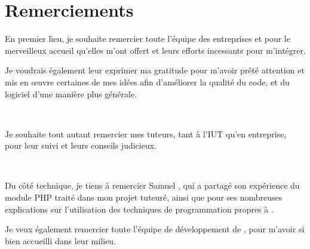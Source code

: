 \chapter*{Remerciements}
En premier lieu, je souhaite remercier toute l'équipe des entreprises \solulog{} et \fidit{} pour le merveilleux accueil qu'elles m'ont offert et leurs efforts incessants pour m'intégrer.

Je voudrais également leur exprimer ma gratitude pour m'avoir prêté attention et mis en \oe{uvre} certaines de mes idées afin d'améliorer la qualité du code, et du logiciel d'une manière plus générale.

~

Je souhaite tout autant remercier mes tuteurs, tant à l'IUT qu'en entreprise, pour leur suivi et leurs conseils judicieux.

~

Du côté technique, je tiens à remercier Samuel , qui a partagé son expérience du module PHP traité dans mon projet tuteuré, ainsi que pour ses nombreuses explications sur l'utilisation des techniques de programmation propres à \solulog.

Je veux également remercier toute l'équipe de développement de \fidit, pour m'avoir si bien accueilli dans leur milieu.
